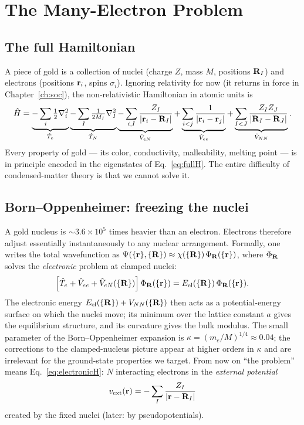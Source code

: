 \chapter{The Many-Electron Problem}
\label{ch:manybody}

\section{The full Hamiltonian}

A piece of gold is a collection of nuclei (charge $Z$, mass $M$, positions
$\mathbf{R}_I$) and electrons (positions $\mathbf{r}_i$, spins $\sigma_i$). Ignoring
relativity for now (it returns in force in Chapter~\ref{ch:soc}), the
non-relativistic Hamiltonian in atomic units is
\begin{equation}
\hat{H} =
\underbrace{-\sum_i \tfrac12 \nabla_i^2}_{\hat T_e}
\underbrace{-\sum_I \tfrac{1}{2M_I}\nabla_I^2}_{\hat T_N}
\underbrace{-\sum_{i,I} \frac{Z_I}{|\mathbf{r}_i - \mathbf{R}_I|}}_{\hat V_{eN}}
+\underbrace{\sum_{i<j} \frac{1}{|\mathbf{r}_i - \mathbf{r}_j|}}_{\hat V_{ee}}
+\underbrace{\sum_{I<J} \frac{Z_I Z_J}{|\mathbf{R}_I - \mathbf{R}_J|}}_{\hat V_{NN}}.
\label{eq:fullH}
\end{equation}
Every property of gold --- its color, conductivity, malleability, melting
point --- is in principle encoded in the eigenstates of
Eq.~\eqref{eq:fullH}. The entire difficulty of condensed-matter theory is
that we cannot solve it.

\section{Born--Oppenheimer: freezing the nuclei}

A gold nucleus is $\sim 3.6\times 10^5$ times heavier than an electron.
Electrons therefore adjust essentially instantaneously to any nuclear
arrangement. Formally, one writes the total wavefunction as
$\Psi(\{\mathbf{r}\},\{\mathbf{R}\}) \approx \chi(\{\mathbf{R}\})\,\Phi_{\mathbf{R}}(\{\mathbf{r}\})$, where
$\Phi_{\mathbf{R}}$ solves the \emph{electronic} problem at clamped nuclei:
\begin{equation}
\Big[\hat T_e + \hat V_{ee} + \hat V_{eN}(\{\mathbf{R}\})\Big]\,
\Phi_{\mathbf{R}}(\{\mathbf{r}\}) = E_{\mathrm{el}}(\{\mathbf{R}\})\,\Phi_{\mathbf{R}}(\{\mathbf{r}\}).
\label{eq:electronicH}
\end{equation}
The electronic energy $E_{\mathrm{el}}(\{\mathbf{R}\}) + V_{NN}(\{\mathbf{R}\})$ then acts
as a potential-energy surface on which the nuclei move; its minimum over the
lattice constant $a$ gives the equilibrium structure, and its curvature gives
the bulk modulus. The small parameter of the Born--Oppenheimer expansion is
$\kappa = (m_e/M)^{1/4} \approx 0.04$; the corrections to the clamped-nucleus
picture appear at higher orders in $\kappa$ and are irrelevant for the
ground-state properties we target. From now on
``the problem'' means Eq.~\eqref{eq:electronicH}: $N$ interacting electrons
in the \emph{external potential}
\begin{equation}
v_{\mathrm{ext}}(\mathbf{r}) = -\sum_I \frac{Z_I}{|\mathbf{r} - \mathbf{R}_I|}
\end{equation}
created by the fixed nuclei (later: by pseudopotentials).

